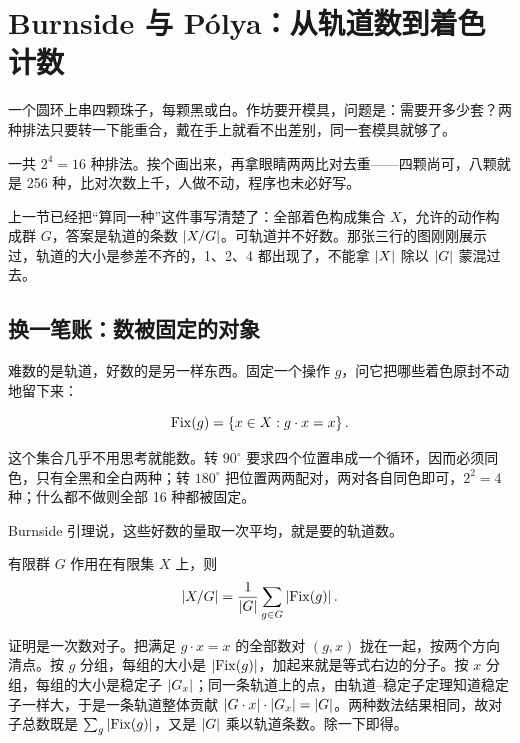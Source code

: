 \section{Burnside 与 Pólya：从轨道数到着色计数}
\label{sec:04-Discrete-Mathematics/06-Groups-and-Symmetry/03}

一个圆环上串四颗珠子，每颗黑或白。作坊要开模具，问题是：需要开多少套？两种排法只要转一下能重合，戴在手上就看不出差别，同一套模具就够了。

一共 \(2^4=16\) 种排法。挨个画出来，再拿眼睛两两比对去重——四颗尚可，八颗就是 256 种，比对次数上千，人做不动，程序也未必好写。

上一节已经把``算同一种''这件事写清楚了：全部着色构成集合 \(X\)，允许的动作构成群 \(G\)，答案是轨道的条数 \(\left|X/G\right|\)。可轨道并不好数。那张三行的图刚刚展示过，轨道的大小是参差不齐的，1、2、4 都出现了，不能拿 \(\left|X\right|\) 除以 \(\left|G\right|\) 蒙混过去。

\subsection{换一笔账：数被固定的对象}

难数的是轨道，好数的是另一样东西。固定一个操作 \(g\)，问它把哪些着色原封不动地留下来：

\[
\operatorname{Fix}(g)=\left\{x\in X:g\cdot x=x\right\}.
\]

这个集合几乎不用思考就能数。转 \(90^\circ\) 要求四个位置串成一个循环，因而必须同色，只有全黑和全白两种；转 \(180^\circ\) 把位置两两配对，两对各自同色即可，\(2^2=4\) 种；什么都不做则全部 16 种都被固定。

Burnside 引理说，这些好数的量取一次平均，就是要的轨道数。

\begin{theorem}[Burnside]
有限群 \(G\) 作用在有限集 \(X\) 上，则
\[
\left|X/G\right|=\frac1{\left|G\right|}\sum_{g\in G}\left|\operatorname{Fix}(g)\right|.
\]
\end{theorem}

证明是一次数对子。把满足 \(g\cdot x=x\) 的全部数对 \((g,x)\) 拢在一起，按两个方向清点。按 \(g\) 分组，每组的大小是 \(\left|\operatorname{Fix}(g)\right|\)，加起来就是等式右边的分子。按 \(x\) 分组，每组的大小是稳定子 \(\left|G_x\right|\)；同一条轨道上的点，由轨道--稳定子定理知道稳定子一样大，于是一条轨道整体贡献 \(\left|G\cdot x\right|\cdot\left|G_x\right|=\left|G\right|\)。两种数法结果相同，故对子总数既是 \(\sum_g\left|\operatorname{Fix}(g)\right|\)，又是 \(\left|G\right|\) 乘以轨道条数。除一下即得。

